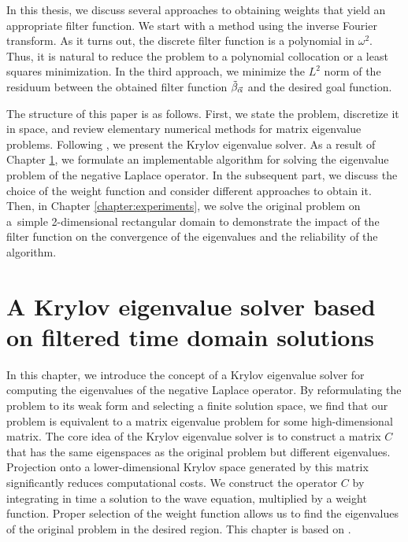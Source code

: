 \documentclass[a4paper,11pt,bibliography=totoc,listof=totoc,headinclude=true,cleardoublepage=empty,oneside]{scrbook}
\newcommand{\dffv}{\Tilde{\beta}_{\Vec{\alpha}}}
\begin{document}
In this thesis, we discuss several approaches to obtaining weights that yield an appropriate filter function. We start with a method using the inverse Fourier transform. As it turns out, the discrete filter function is a polynomial in $\omega^2$. Thus, it is natural to reduce the problem to a polynomial collocation or a least squares minimization. In the third approach, we minimize the $L^2$ norm of the residuum between the obtained filter function $\dffv$ and the desired goal function.

The structure of this paper is as follows. First, we state the problem, discretize it in space, and review elementary numerical methods for matrix eigenvalue problems. Following \cite{nannen}, we present the Krylov eigenvalue solver. As a result of Chapter \ref{chapter:ftd}, we formulate an implementable algorithm for solving the eigenvalue problem of the negative Laplace operator. In the subsequent part, we discuss the choice of the weight function and consider different approaches to obtain it. Then, in Chapter \ref{chapter:experiments}, we solve the original problem on a~simple 2-dimensional rectangular domain to demonstrate the impact of the filter function on the convergence of the eigenvalues and the reliability of the algorithm.


\chapter{A Krylov eigenvalue solver based on filtered time domain solutions}
\label{chapter:ftd}
In this chapter, we introduce the concept of a Krylov eigenvalue solver for computing the eigenvalues of the negative Laplace operator. By reformulating the problem to its weak form and selecting a finite solution space, we find that our problem is equivalent to a matrix eigenvalue problem for some high-dimensional matrix. The core idea of the Krylov eigenvalue solver is to construct a matrix $C$ that has the same eigenspaces as the original problem but different eigenvalues. Projection onto a lower-dimensional Krylov space generated by this matrix significantly reduces computational costs. We construct the operator $C$ by integrating in time a solution to the wave equation, multiplied by a weight function. Proper selection of the weight function allows us to find the eigenvalues of the original problem in the desired region. This chapter is based on \cite{nannen}.
\end{document}
